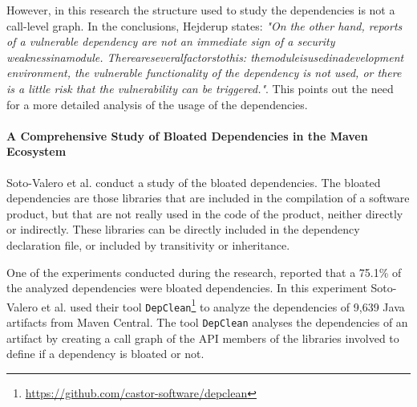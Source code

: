 However, in this research the structure used to study the dependencies is not a call-level graph. In the conclusions, Hejderup states: \textit{"On the other hand, reports of a vulnerable dependency are not an immediate sign of a security weaknessinamodule. Thereareseveralfactorstothis: themoduleisusedinadevelopment environment, the vulnerable functionality of the dependency is not used, or there is a little risk that the vulnerability can be triggered."}. This points out the need for a more detailed analysis of the usage of the dependencies.

\paragraph{A Comprehensive Study of Bloated Dependencies in the Maven Ecosystem \cite{soto2020comprehensive}}
Soto-Valero et al. conduct a study of the bloated dependencies. The bloated dependencies are those libraries that are included in the compilation of a software product, but that are not really used in the code of the product, neither directly or indirectly. These libraries can be directly included in the dependency declaration file, or included by transitivity or inheritance.

One of the experiments conducted during the research, reported that a 75.1\% of the analyzed dependencies were bloated dependencies. In this experiment Soto-Valero et al. used their tool \texttt{DepClean}\footnote{\href{https://github.com/castor-software/depclean}{https://github.com/castor-software/depclean}} to analyze the dependencies of 9,639 Java artifacts from Maven Central.
The tool \texttt{DepClean} analyses the dependencies of an artifact by creating a call graph of the API members of the libraries involved to define if a dependency is bloated or not.





